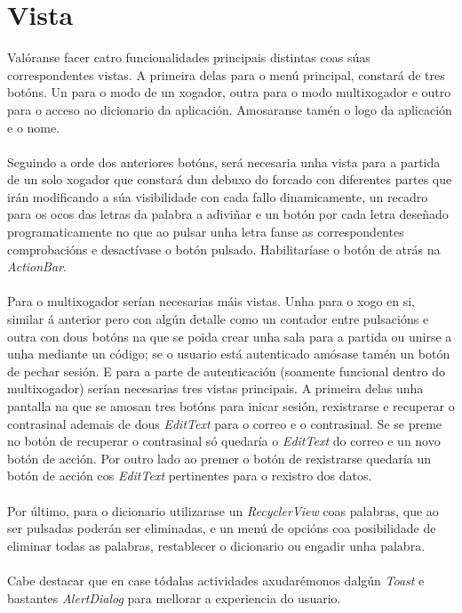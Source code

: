 \section {Vista}
Valóranse facer catro funcionalidades principais distintas coas súas correspondentes vistas. A primeira delas para o menú principal, constará de tres botóns. Un para o modo de un xogador, outra para o modo multixogador e outro para o acceso ao dicionario da aplicación. Amosaranse tamén o logo da aplicación e o nome.\\
\\
Seguindo a orde dos anteriores botóns, será necesaria unha vista para a partida de un solo xogador que constará dun debuxo do forcado con diferentes partes que irán modificando a súa visibilidade con cada fallo dinamicamente, un recadro para os ocos das letras da palabra a adiviñar e un botón por cada letra deseñado programaticamente no que ao pulsar unha letra fanse as correspondentes comprobacións e desactívase o botón pulsado. Habilitaríase o botón de atrás na \textit{ActionBar}. \\
\\
Para o multixogador serían necesarias máis vistas. Unha para o xogo en si, similar á anterior pero con algún detalle como un contador entre pulsacións e outra con dous botóns na que se poida crear unha sala para a partida ou unirse a unha mediante un código; se o usuario está autenticado amósase tamén un botón de pechar sesión. E para a parte de autenticación (soamente funcional dentro do multixogador) serían necesarias tres vistas principais. A primeira delas unha pantalla na que se amosan tres botóns para inicar sesión, rexistrarse e recuperar o contrasinal ademais de dous \textit{EditText} para o correo e o contrasinal. Se se preme no botón de recuperar o contrasinal só quedaría o \textit{EditText} do correo e un novo botón de acción. Por outro lado ao premer o botón de rexistrarse quedaría un botón de acción cos \textit{EditText} pertinentes para o rexistro dos datos. \\
\\
Por último, para o dicionario utilizarase un \textit{RecyclerView} coas palabras, que ao ser pulsadas poderán ser eliminadas, e un menú de opcións coa posibilidade de eliminar todas as palabras, restablecer o dicionario ou engadir unha palabra.\\
\\
Cabe destacar que en case tódalas actividades axudarémonos dalgún \textit{Toast} e bastantes \textit{AlertDialog} para mellorar a experiencia do usuario.

